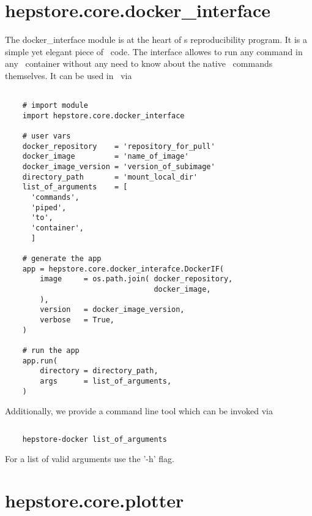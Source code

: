 
\section{hepstore.core.docker\_interface}

The docker\_interface module is at the heart of \hepstore s
reproducibility program. It is a simple yet elegant piece of
\python~code. The interface allowes to run any command in any
\docker~container without any need to know about the native
\docker~commands themselves. It can be used in \python~via
%
\begin{changemargin}{1.5cm}{1.5cm}
  \centering
  \begin{lstlisting}
    
    # import module
    import hepstore.core.docker_interface

    # user vars
    docker_repository    = 'repository_for_pull'
    docker_image         = 'name_of_image'
    docker_image_version = 'version_of_subimage'
    directory_path       = 'mount_local_dir'
    list_of_arguments    = [
      'commands',
      'piped',
      'to',
      'container',
      ]
    
    # generate the app
    app = hepstore.core.docker_interafce.DockerIF(    
        image     = os.path.join( docker_repository,
                                  docker_image,
        ),
        version   = docker_image_version,
        verbose   = True,
    )

    # run the app
    app.run(
        directory = directory_path,
        args      = list_of_arguments,
    )
  \end{lstlisting}
\end{changemargin}
%
Additionally, we provide a command line tool which can be invoked via
%
\begin{changemargin}{1.5cm}{1.5cm}
  \centering
  \begin{lstlisting}[language=Bash]
    
    hepstore-docker list_of_arguments
  \end{lstlisting}
\end{changemargin}
%
For a list of valid arguments use the '-h' flag.

\section{hepstore.core.plotter}

